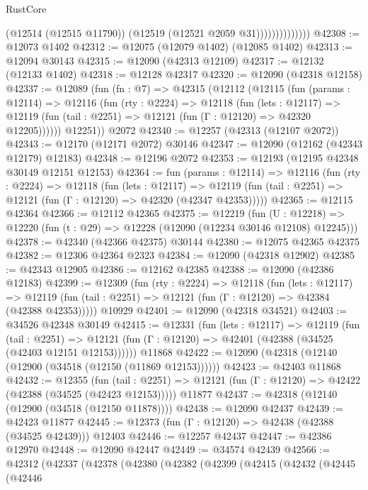 \begin{lexlean}{RustCore}
\begin{coremodule}
                            (@12514 (@12515 @11790))
                            (@12519 (@12521 @2059 @31))))))))))))))
@42308 := @12073 @1402
@42312 := @12075 (@12079 @1402) (@12085 @1402)
@42313 := @12094 @30143
@42315 := @12090 (@42313 @12109)
@42317 := @12132 (@12133 @1402)
@42318 := @12128 @42317
@42320 := @12090 (@42318 @12158)
@42337 := @12089
    (fun (fn : @7) =>
    @42315
      (@12112
        (@12115
          (fun (params : @12114) =>
          @12116
            (fun (rty : @2224) =>
            @12118
              (fun (lets : @12117) =>
              @12119 (fun (tail : @2251) => @12121 (fun (Γ : @12120) => @42320 @12205))))))
        @12251))
    @2072
@42340 := @12257 (@42313 (@12107 @2072))
@42343 := @12170 (@12171 @2072) @30146
@42347 := @12090 (@12162 (@42343 @12179) @12183)
@42348 := @12196 @2072
@42353 := @12193 (@12195 @42348 @30149 @12151 @12153)
@42364 := fun (params : @12114) =>
  @12116
    (fun (rty : @2224) =>
    @12118
      (fun (lets : @12117) =>
      @12119 (fun (tail : @2251) => @12121 (fun (Γ : @12120) => @42320 (@42347 @42353)))))
@42365 := @12115 @42364
@42366 := @12112 @42365
@42375 := @12219
    (fun (U : @12218) => @12220 (fun (t : @29) => @12228 (@12090 (@12234 @30146 @12108) @12245)))
@42378 := @42340 (@42366 @42375) @30144
@42380 := @12075 @42365 @42375
@42382 := @12306 @42364 @2323
@42384 := @12090 (@42318 @12902)
@42385 := @42343 @12905
@42386 := @12162 @42385
@42388 := @12090 (@42386 @12183)
@42399 := @12309
    (fun (rty : @2224) =>
    @12118
      (fun (lets : @12117) =>
      @12119 (fun (tail : @2251) => @12121 (fun (Γ : @12120) => @42384 (@42388 @42353)))))
    @10929
@42401 := @12090 (@42318 @34521)
@42403 := @34526 @42348 @30149
@42415 := @12331
    (fun (lets : @12117) =>
    @12119
      (fun (tail : @2251) =>
      @12121 (fun (Γ : @12120) => @42401 (@42388 (@34525 (@42403 @12151 @12153))))))
    @11868
@42422 := @12090 (@42318 (@12140 (@12900 (@34518 (@12150 (@11869 @12153))))))
@42423 := @42403 @11868
@42432 := @12355
    (fun (tail : @2251) => @12121 (fun (Γ : @12120) => @42422 (@42388 (@34525 (@42423 @12153)))))
    @11877
@42437 := @42318 (@12140 (@12900 (@34518 (@12150 @11878))))
@42438 := @12090 @42437
@42439 := @42423 @11877
@42445 := @12373 (fun (Γ : @12120) => @42438 (@42388 (@34525 @42439))) @12403
@42446 := @12257 @42437
@42447 := @42386 @12970
@42448 := @12090 @42447
@42449 := @34574 @42439
@42566 := @42312
    (@42337
      (@42378
        (@42380
          (@42382
            (@42399
              (@42415
                (@42432
                  (@42445
                    (@42446

\end{coremodule}
\end{lexlean}
